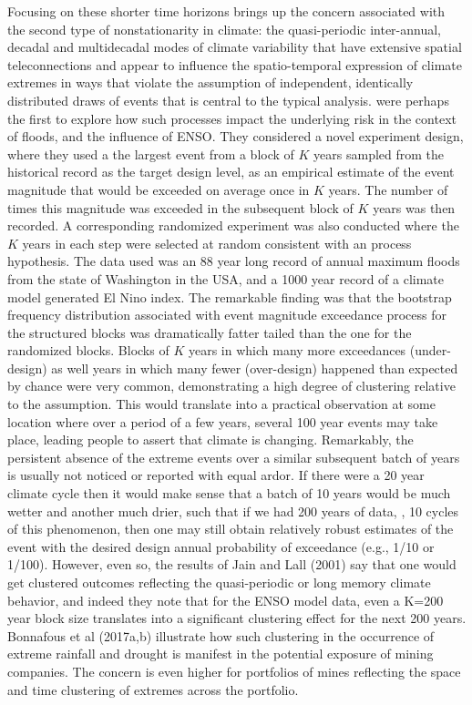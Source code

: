\documentclass[11pt]{article}
\begin{document}
Focusing on these shorter time horizons brings up the concern associated with the second type of nonstationarity in climate: the quasi-periodic inter-annual, decadal and multidecadal modes of climate variability that have extensive spatial teleconnections and appear to influence the spatio-temporal expression of climate extremes in ways that violate the assumption of independent, identically distributed draws of events that is central to the typical analysis.
\citet{Jain2001} were perhaps the first to explore how such processes impact the underlying risk in the context of floods, and the influence of ENSO. 
They considered a novel experiment design, where they used a the largest event from a block of \(K\) years sampled from the historical record as the target design level, as an empirical estimate of the event magnitude that would be exceeded on average once in \(K\) years. 
The number of times this magnitude was exceeded in the subsequent block of \(K\) years was then recorded. 
A corresponding randomized experiment was also conducted where the \(K\) years in each step were selected at random consistent with an \iid process hypothesis.
The data used was an 88 year long record of annual maximum floods from the state of Washington in the USA, and a 1000 year record of a climate model generated El Nino index. 
The remarkable finding was that the bootstrap frequency distribution associated with event magnitude exceedance process for the structured blocks was dramatically fatter tailed than the one for the randomized blocks. 
Blocks of \(K\) years in which many more exceedances (under-design) as well years in which many fewer (over-design)  happened than expected by chance were very common, demonstrating a high degree of clustering relative to the \iid assumption. 
This would translate into a practical observation at some location where over a period of a few years, several 100 year events may take place, leading people to assert that climate is changing.
Remarkably, the persistent absence of the extreme events over a similar subsequent batch of years is usually not noticed or reported with equal ardor. 
If there were a 20 year climate cycle then it would make sense that a batch of 10 years would be much wetter and another much drier, such that if we had 200 years of data, \ie{}, 10 cycles of this phenomenon, then one may still obtain relatively robust estimates of the event with the desired design annual probability of exceedance (e.g., 1/10 or 1/100).
However, even so, the results of Jain and Lall (2001) say that one would get clustered outcomes reflecting the quasi-periodic or long memory climate behavior, and indeed they note that for the ENSO model data, even a K=200 year block size translates into a significant clustering effect for the next 200 years.
Bonnafous et al (2017a,b) illustrate how such clustering in the occurrence of extreme rainfall and drought is manifest in the potential exposure of mining companies.
The concern is even higher for portfolios of mines reflecting the space and time clustering of extremes across the portfolio.
\end{document}
